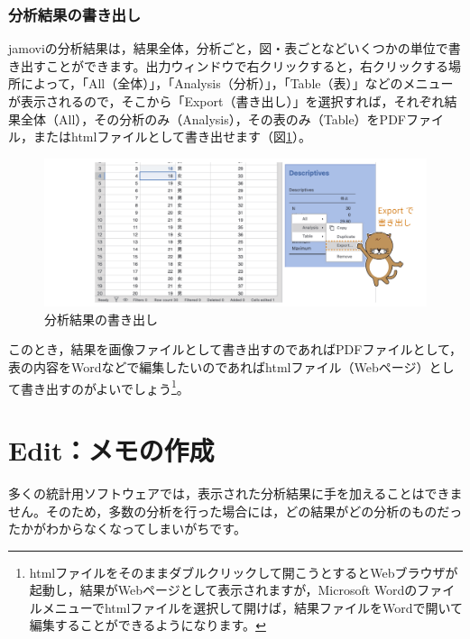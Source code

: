 \documentclass[
  12pt,
  a5jpaper,
  lualatex, ja=standard]{bxjsbook}
\begin{document}
\hypertarget{ux5206ux6790ux7d50ux679cux306eux66f8ux304dux51faux3057}{%
\subsubsection*{分析結果の書き出し}\label{ux5206ux6790ux7d50ux679cux306eux66f8ux304dux51faux3057}}

jamoviの分析結果は，結果全体，分析ごと，図・表ごとなどいくつかの単位で書き出すことができます。出力ウィンドウで右クリックすると，右クリックする場所によって，「All（全体）」，「Analysis（分析）」，「Table（表）」などのメニューが表示されるので，そこから「Export（書き出し）」を選択すれば，それぞれ結果全体（All），その分析のみ（Analysis），その表のみ（Table）をPDFファイル，またはhtmlファイルとして書き出せます（図\ref{fig:bs2-result-export}）。

\begin{figure}[!ht]

{\centering \includegraphics[width=1\linewidth]{images/basics2/result-export} 

}

\caption{分析結果の書き出し}\label{fig:bs2-result-export}
\end{figure}

このとき，結果を画像ファイルとして書き出すのであればPDFファイルとして，表の内容をWordなどで編集したいのであればhtmlファイル（Webページ）として書き出すのがよいでしょう\footnote{htmlファイルをそのままダブルクリックして開こうとするとWebブラウザが起動し，結果がWebページとして表示されますが，Microsoft Wordのファイルメニューでhtmlファイルを選択して開けば，結果ファイルをWordで開いて編集することができるようになります。}。

\hypertarget{sec:reporting}{%
\section{Edit：メモの作成}\label{sec:reporting}}

多くの統計用ソフトウェアでは，表示された分析結果に手を加えることはできません。そのため，多数の分析を行った場合には，どの結果がどの分析のものだったかがわからなくなってしまいがちです。
\end{document}

